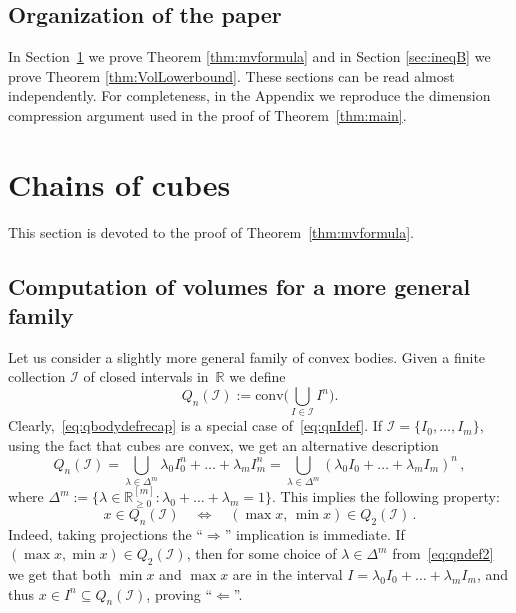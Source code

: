 \documentclass[a4paper,reqno,12pt]{amsart}
\newcommand{\I}{\mathscr{I}}
\renewcommand{\r}{\mathbb{R}}
\newcommand{\1}{\bo{1}}
\begin{document}
\subsection{Organization of the paper}
In Section~\ref{sec:ineqA} we prove Theorem \ref{thm:mvformula} and in Section \ref{sec:ineqB} we prove Theorem \ref{thm:VolLowerbound}. These sections can be read almost independently. 
For completeness, in the Appendix we reproduce the dimension compression argument used in the proof of Theorem~\ref{thm:main}.

\section{Chains of cubes}
\label{sec:ineqA}


This section is devoted to the proof of Theorem~\ref{thm:mvformula}.

\subsection{Computation of volumes for a more general family}
Let us consider a slightly more general family of convex bodies. Given a finite collection $\I$ of closed intervals in~$\r$ we define 
    \begin{equation} \label{eq:qnIdef}
    Q_n(\I) := \mathrm{conv}\Big(\bigcup_{I\in\I}I^n\Big).
    \end{equation}
Clearly,~\eqref{eq:qbodydefrecap} is a special case of~\eqref{eq:qnIdef}. If $\I=\{I_0,\dots,I_m\}$, using the fact that cubes are convex, we get an alternative description
    \begin{equation} \label{eq:qndef2}
    Q_n(\I) = \bigcup_{\lambda\in\Delta^m}\lambda_0 I_0^n+\dots+\lambda_mI_m^n
    = \bigcup_{\lambda\in\Delta^m}(\lambda_0 I_0+\dots+\lambda_mI_m)^n\,,
    \end{equation}
where $\Delta^m:=\{\lambda\in\r_{\ge0}^{[m]}\colon\lambda_0+\dots+\lambda_m=1\}$. This implies the following property:
    \begin{equation}\label{eq:q2-qn}
    x\in Q_n(\I) \quad \Leftrightarrow \quad 
    (\max x,\,\min x) \in Q_2(\I)\,.
    \end{equation}
Indeed, taking projections the ``$\Rightarrow$'' implication is immediate. If $(\max x,\min x)\in Q_2(\I)$, then for some choice of $\lambda\in\Delta^m$
from~\eqref{eq:qndef2} we get that both $\min x$ and $\max x$ are in the interval $I=\lambda_0I_0+\dots+\lambda_mI_m$, and thus $x\in I^n\subseteq Q_n(\I)$, proving ``$\Leftarrow$''.
\end{document}
